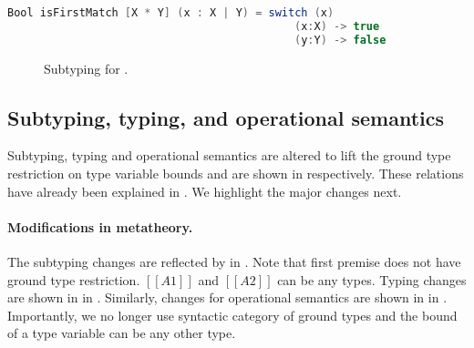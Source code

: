\begin{lstlisting}[language=Scala]
  Bool isFirstMatch [X * Y] (x : X | Y) = switch (x)
                                            (x:X) -> true
                                            (y:Y) -> false
\end{lstlisting}



\begin{figure}[t]
  \begin{small}
    \centering
  \end{small}
  \caption{Subtyping for \name.}
  \label{fig:union:rev:poly:sub}
\end{figure}


\subsection{Subtyping, typing, and operational semantics}
Subtyping, typing and operational semantics are altered to lift
the ground type restriction on type variable bounds and are shown in 
respectively. These relations have already been explained in 
. We highlight the major changes next.

\paragraph{Modifications in metatheory.}
The subtyping changes are reflected by  in .
Note that first premise does not have ground type restriction.
$[[A1]]$ and $[[A2]]$ can be any types.
Typing changes are shown in  in .
Similarly, changes for operational semantics are shown in  in
. Importantly, we no longer use syntactic category
of ground types and the bound of a type variable can be any other type.




